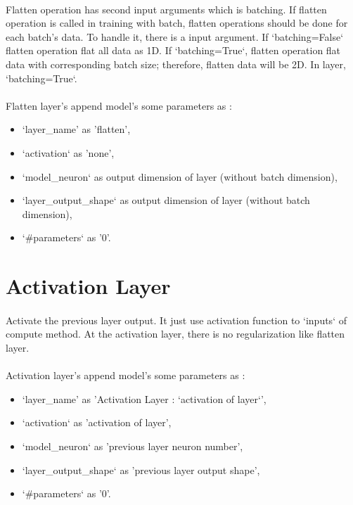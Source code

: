 \documentclass[12pt]{report}
\begin{document}
\paragraph{}
Flatten operation has second input arguments which is batching. If flatten operation is called in training with batch, flatten operations should be done for each batch's data. To handle it, there is a input argument. If `batching=False` flatten operation flat all data as 1D. If `batching=True`, flatten operation flat data with corresponding batch size; therefore, flatten data will be 2D. In layer, `batching=True`.


\paragraph{}
Flatten layer's append model's some parameters as :
\begin{itemize}
	\item `layer\_name' as 'flatten',
	\item `activation` as 'none',
	\item `model\_neuron` as output dimension of layer (without batch dimension),
	\item `layer\_output\_shape` as output dimension of layer (without batch dimension),
	\item `\#parameters` as '0'.
\end{itemize}



\section{Activation Layer}

\paragraph{}
Activate the previous layer output. It just use activation function to `inputs` of compute method. At the activation layer, there is no regularization like flatten layer.

\paragraph{}
Activation layer's append model's some parameters as :

\begin{itemize}
	\item `layer\_name' as 'Activation Layer : `activation of layer`',
	\item `activation` as 'activation of layer',
	\item `model\_neuron` as 'previous layer neuron number',
	\item `layer\_output\_shape` as 'previous layer output shape',
	\item `\#parameters` as '0'.
\end{itemize}
\end{document}
